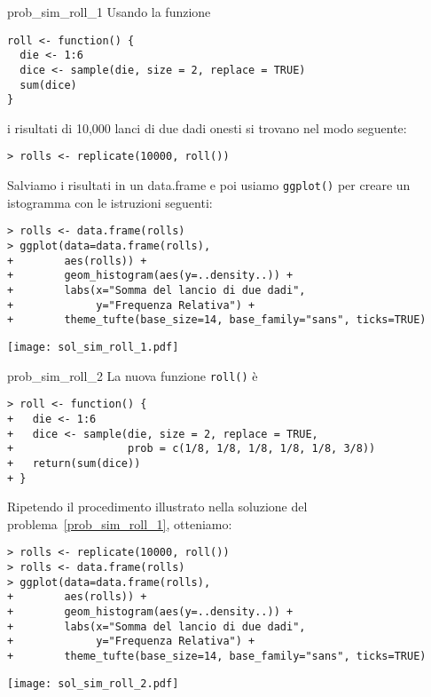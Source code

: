 \begin{sol}{prob_sim_roll_1}
Usando la funzione
\begin{verbatim}
roll <- function() {
  die <- 1:6
  dice <- sample(die, size = 2, replace = TRUE)
  sum(dice)
}
\end{verbatim}
i risultati di 10,000 lanci di due dadi onesti si trovano nel modo seguente:
\begin{verbatim}
> rolls <- replicate(10000, roll())
\end{verbatim}
Salviamo i risultati in un data.frame e poi usiamo \verb+ggplot()+ per creare un istogramma con le istruzioni seguenti:
\begin{verbatim}
> rolls <- data.frame(rolls)
> ggplot(data=data.frame(rolls),
+        aes(rolls)) +
+        geom_histogram(aes(y=..density..)) +
+        labs(x="Somma del lancio di due dadi",
+             y="Frequenza Relativa") +
+        theme_tufte(base_size=14, base_family="sans", ticks=TRUE) 
\end{verbatim}
  \begin{center}
    \texttt{[image: sol\_sim\_roll\_1.pdf]}
  \end{center}
\end{sol}


\begin{sol}{prob_sim_roll_2}
La nuova funzione \verb+roll()+ è
\begin{verbatim}
> roll <- function() {
+   die <- 1:6
+   dice <- sample(die, size = 2, replace = TRUE,
+                  prob = c(1/8, 1/8, 1/8, 1/8, 1/8, 3/8))
+   return(sum(dice))
+ }
\end{verbatim}
Ripetendo il procedimento illustrato nella soluzione del problema~\ref{prob_sim_roll_1}, otteniamo:
\begin{verbatim}
> rolls <- replicate(10000, roll())
> rolls <- data.frame(rolls)
> ggplot(data=data.frame(rolls),
+        aes(rolls)) +
+        geom_histogram(aes(y=..density..)) +
+        labs(x="Somma del lancio di due dadi",
+             y="Frequenza Relativa") +
+        theme_tufte(base_size=14, base_family="sans", ticks=TRUE)
\end{verbatim}
  \begin{center}
    \texttt{[image: sol\_sim\_roll\_2.pdf]}
  \end{center}
\end{sol}


